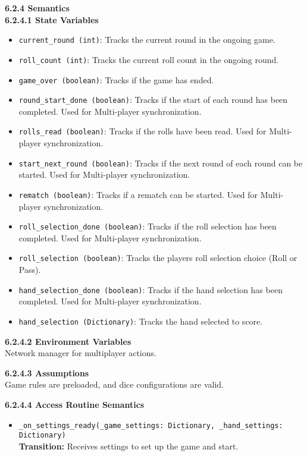 \documentclass[12pt, titlepage]{article}
\begin{document}
\textbf{6.2.4 Semantics}\\
\textbf{6.2.4.1 State Variables}\\
\begin{itemize}
    \item \texttt{current\_round (int)}: Tracks the current round in the ongoing game.
    \item \texttt{roll\_count (int)}: Tracks the current roll count in the ongoing round.
    \item \texttt{game\_over (boolean)}: Tracks if the game has ended.
    \item \texttt{round\_start\_done (boolean)}: Tracks if the start of each round has been completed. Used for Multi-player synchronization.
    \item \texttt{rolls\_read (boolean)}: Tracks if the rolls have been read. Used for Multi-player synchronization.
    \item \texttt{start\_next\_round (boolean)}: Tracks if the next round of each round can be started. Used for Multi-player synchronization.
    \item \texttt{rematch (boolean)}: Tracks if a rematch can be started. Used for Multi-player synchronization.
    \item \texttt{roll\_selection\_done (boolean)}: Tracks if the roll selection has been completed. Used for Multi-player synchronization.
    \item \texttt{roll\_selection (boolean)}: Tracks the players roll selection choice (Roll or Pass).
    \item \texttt{hand\_selection\_done (boolean)}: Tracks if the hand selection has been completed. Used for Multi-player synchronization.
    \item \texttt{hand\_selection (Dictionary)}: Tracks the hand selected to score.
\end{itemize}

\textbf{6.2.4.2 Environment Variables}\\
Network manager for multiplayer actions.

\textbf{6.2.4.3 Assumptions}\\
Game rules are preloaded, and dice configurations are valid.

\textbf{6.2.4.4 Access Routine Semantics}
\begin{itemize}
    \item \texttt{\_on\_settings\_ready(\_game\_settings: Dictionary, \_hand\_settings: Dictionary)}\\
    \textbf{Transition:} Receives settings to set up the game and start.
\end{itemize}
\end{document}
